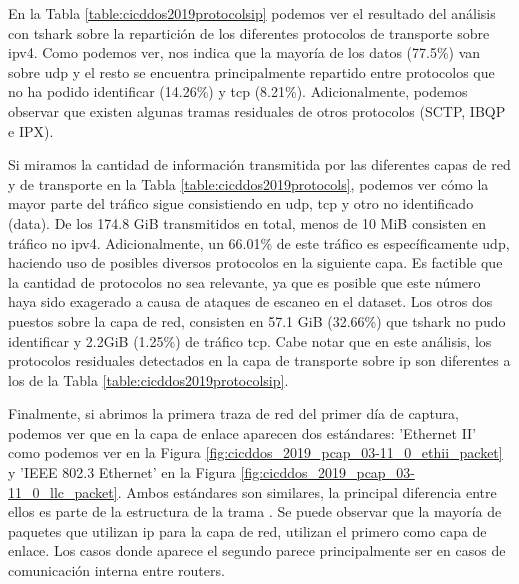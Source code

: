 En la Tabla \ref{table:cicddos2019protocolsip} podemos ver el resultado del análisis con tshark sobre la repartición de los diferentes protocolos de transporte sobre \acrshort{ipv4}. Como podemos ver, nos indica que la mayoría de los datos (77.5\%) van sobre \acrshort{udp} y el resto se encuentra principalmente repartido entre protocolos que no ha podido identificar (14.26\%) y \acrshort{tcp} (8.21\%). Adicionalmente, podemos observar que existen algunas tramas residuales de otros protocolos (SCTP, IBQP e IPX).



Si miramos la cantidad de información transmitida por las diferentes capas de red y de transporte en la Tabla \ref{table:cicddos2019protocols}, podemos ver cómo la mayor parte del tráfico sigue consistiendo en \acrshort{udp}, \acrshort{tcp} y otro no identificado (data). De los 174.8 GiB transmitidos en total, menos de 10 MiB consisten en tráfico no \acrshort{ipv4}. Adicionalmente, un 66.01\% de este tráfico es específicamente \acrshort{udp}, haciendo uso de posibles diversos protocolos en la siguiente capa. Es factible que la cantidad de protocolos no sea relevante, ya que es posible que este número haya sido exagerado a causa de ataques de escaneo en el dataset. Los otros dos puestos sobre la capa de red, consisten en 57.1 GiB (32.66\%) que tshark no pudo identificar y 2.2GiB (1.25\%) de tráfico \acrshort{tcp}. Cabe notar que en este análisis, los protocolos residuales detectados en la capa de transporte sobre \acrshort{ip} son diferentes a los de la Tabla \ref{table:cicddos2019protocolsip}.



Finalmente, si abrimos la primera traza de red del primer día de captura, podemos ver que en la capa de enlace aparecen dos estándares: 'Ethernet II' como podemos ver en la Figura \ref{fig:cicddos_2019_pcap_03-11_0_ethii_packet} y 'IEEE 802.3 Ethernet' en la Figura \ref{fig:cicddos_2019_pcap_03-11_0_llc_packet}. Ambos estándares son similares, la principal diferencia entre ellos es parte de la estructura de la trama \cite{IBMeth2vsllc}. Se puede observar que la mayoría de paquetes que utilizan \acrshort{ip} para la capa de red, utilizan el primero como capa de enlace. Los casos donde aparece el segundo parece principalmente ser en casos de comunicación interna entre routers.

